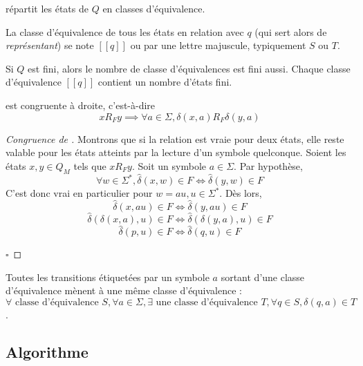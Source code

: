\begin{corollary}
 \rf répartit les états de $Q$ en classes d'équivalence.
\end{corollary}

La classe d'équivalence de tous les états en relation \rf avec $q$ (qui sert alors de \emph{représentant}) se note $[[q]]$ ou par une lettre majuscule, typiquement $S$ ou $T$.

\begin{corollary}\label{col:qclasses}
  Si $Q$ est fini, alors le nombre de classe d'équivalences est fini aussi. Chaque classe d'équivalence $[[q]]$ contient un nombre d'états fini.
\end{corollary}

\begin{proposition}[Congruence de \rf]
 \rf est congruente à droite, c'est-à-dire $$xR_Fy \implies \forall a \in \Sigma, \delta(x,a)R_F\delta(y,a)$$
\end{proposition}

\begin{proof}[Congruence de \rf]\label{proof:rmcongruency}
 Montrons que si la relation est vraie pour deux états, elle reste valable pour les états atteints par la lecture d'un symbole quelconque. Soient les états $x,y \in Q_M$ tels que $xR_Fy$. Soit un symbole $a \in \Sigma$. Par hypothèse,
 $$\forall w \in \Sigma^*, \hat{\delta}(x, w) \in F \iff \hat{\delta}(y, w) \in F$$
 C'est donc vrai en particulier pour $w = au, u \in \Sigma^*$. Dès lors,
 $$\hat{\delta}(x, au) \in F\iff \hat{\delta}(y, au)\in F$$
 $$\hat{\delta}(\delta(x,a),u) \in F\iff\hat{\delta}(\delta(y,a),u)\in F$$
 $$\hat{\delta}(p,u) \in F\iff \hat{\delta}(q,u)\in F$$

\hfill$\square$
\end{proof}

\begin{corollary}\label{col:st}
 Toutes les transitions étiquetées par un symbole $a$ sortant d'une classe d'équivalence mènent à une même classe d'équivalence :
 $\forall\text{ classe d'équivalence }S,\forall a \in \Sigma, \exists\text{ une classe d'équivalence } T, \forall q \in S, \delta(q,a)\in T$.
\end{corollary}



\subsection{Algorithme}\label{tfa:tfa}

